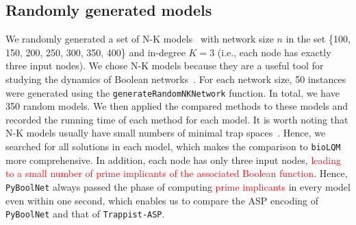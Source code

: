 \documentclass[preprint,12pt]{elsarticle}
\newcommand{\change}[1]{\textcolor{red}{#1}}
\begin{document}
\subsection{Randomly generated models}

We randomly generated a set of N-K models~\cite{glass1973logical} with network size \(n\) in the set \{100, 150, 200, 250, 300, 350, 400\} and in-degree \(K = 3\) (i.e., each node has exactly three input nodes).
We chose N-K models because they are a useful tool for studying the dynamics of Boolean networks~\cite{glass1973logical,klarner2015computing,Rozum2021}.
For each network size, 50 instances were generated using the \verb|generateRandomNKNetwork| function.
In total, we have 350 random models.
We then applied the compared methods to these models and recorded the running time of each method for each model.
It is worth noting that N-K models usually have small numbers of minimal trap spaces~\cite{klarner2015computing}.
Hence, we searched for all solutions in each model, which makes the comparison to \texttt{bioLQM} more comprehensive.
In addition, each node has only three input nodes, \change{leading to a small number of prime implicants of
the associated Boolean function}.
Hence, \texttt{PyBoolNet} always passed the phase of computing \change{prime implicants} in every model even within one second, which enables us to compare the ASP encoding of \texttt{PyBoolNet} and that of \texttt{Trappist-ASP}.
\end{document}
